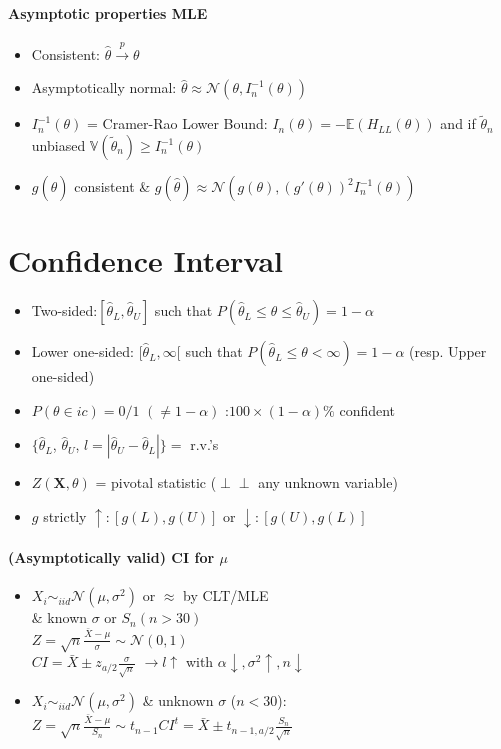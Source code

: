 \documentclass[paper=a4,fontsize=8pt,pagesize,DIV=calc]{scrartcl}
\newcounter{row}
\def\Perp{\perp\!\!\!\perp}
\begin{document}
\begin{multicols}{3}
\paragraph{Asymptotic properties MLE}
\begin{itemize}
\item Consistent: $\hat{\theta} \xrightarrow{p} \theta$
\item Asymptotically normal: $\hat{\theta} \approx \mathcal{N}(\theta,I^{-1}_n(\theta))$
\item $I^{-1}_n(\theta)$ = Cramer-Rao Lower Bound: $I_n(\theta)=-\mathbb{E}(H_{LL}(\theta))$ and if $\tilde{\theta}_n$ unbiased $\mathbb{V}(\tilde{\theta}_n)\geq I^{-1}_n(\theta)$
\item $g(\hat{\theta})$ consistent \& $g(\hat{\theta})\approx \mathcal{N}(g(\theta),(g'(\theta))^2I^{-1}_n(\theta))$
\end{itemize}
\section{Confidence Interval}
\begin{itemize}
\item Two-sided:$[\hat{\theta}_L,\hat{\theta}_U]$ such that $P(\hat{\theta}_L\leq \theta\leq \hat{\theta}_U)=1-\alpha$
\item Lower one-sided: $[\hat{\theta}_L,\infty[$ such that $P(\hat{\theta}_L\leq \theta < \infty)=1-\alpha$ (resp. Upper one-sided)
\item $P(\theta \in ic)= 0/1$ $(\neq 1- \alpha)$ :$100\times(1-\alpha)\%$ confident 
\item $\{\hat{\theta}_L$, $\hat{\theta}_U$, $l=|\hat{\theta}_U-\hat{\theta}_L|\}=$ r.v.'s
\item $Z(\textbf{X},\theta)$ = pivotal statistic ($\Perp$ any unknown variable)
\item $g$ strictly $\uparrow: [g(L),g(U)]$ or  $\downarrow: [g(U),g(L)]$
\end{itemize} 
\paragraph{(Asymptotically valid) CI for $\mu$}
\begin{itemize}
\item $X_i\sim_{iid}\mathcal{N}(\mu,\sigma^2)$ or $\approx$ by CLT/MLE \\ \& known $\sigma$ or $S_n( n>30)$ \\
$Z=\sqrt{n}\frac{\bar{X}-\mu}{\sigma}\sim \mathcal{N}(0,1)$\\ 
$CI=\bar{X}\pm z_{a/2}\frac{\sigma}{\sqrt{n}}$ $\rightarrow l\uparrow$ with $\alpha \downarrow, \sigma^2 \uparrow, n \downarrow$
\item $X_i\sim_{iid}\mathcal{N}(\mu,\sigma^2)$ \& unknown $\sigma$ ($n<30$): \\
$Z=\sqrt{n}\frac{\bar{X}-\mu}{S_n}\sim t_{n-1}$\hspace{0.5cm}$CI^t=\bar{X}\pm t_{n-1,a/2}\frac{S_n}{\sqrt{n}}$
\end{itemize}

\end{multicols}
\end{document}
